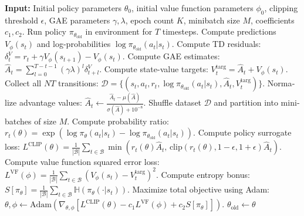\begin{latin}
\begin{algorithm}[H]
\caption{Proximal Policy Optimization (PPO), Actor-Critic Style}
\label{alg:ppo_actor_critic}
\begin{algorithmic}[1]
\State \textbf{Input:} Initial policy parameters $\theta_0$, initial value function parameters $\phi_0$, clipping threshold $\epsilon$, GAE parameters $\gamma, \lambda$, epoch count $K$, minibatch size $M$, coefficients $c_1, c_2$.
        \State Run policy $\pi_{\theta_{\text{old}}}$ in environment for $T$ timesteps.
        \State Compute predictions $V_\phi(s_t)$ and log-probabilities $\log \pi_{\theta_{\text{old}}}(a_t | s_t)$.
        \State Compute TD residuals: $\delta_t^V = r_t + \gamma V_\phi(s_{t+1}) - V_\phi(s_t)$.
        \State Compute GAE estimates: $\hat{A}_t = \sum_{l=0}^{T-t-1} (\gamma \lambda)^l \delta_{t+l}^V$.
        \State Compute state-value targets: $V_t^{\text{targ}} = \hat{A}_t + V_\phi(s_t)$.
    \EndFor
    \State Collect all $NT$ transitions: $\mathcal{D} = \{(s_t, a_t, r_t, \log\pi_{\theta_{\text{old}}}(a_t|s_t), \hat{A}_t, V_t^{\text{targ}})\}$.
    \State Normalize advantage values: $\hat{A}_t \leftarrow \frac{\hat{A}_t - \mu(\hat{A})}{\sigma(\hat{A}) + 10^{-8}}$.
        \State Shuffle dataset $\mathcal{D}$ and partition into minibatches of size $M$.
            \State Compute probability ratio: $r_t(\theta) = \exp\left(\log \pi_\theta(a_t|s_t) - \log \pi_{\theta_{\text{old}}}(a_t|s_t)\right)$.
            \State Compute policy surrogate loss: 
            \State \quad $L^{\text{CLIP}}(\theta) = \frac{1}{|\mathcal{B}|} \sum_{t \in \mathcal{B}} \min\left( r_t(\theta)\hat{A}_t, \, \text{clip}(r_t(\theta), 1-\epsilon, 1+\epsilon)\hat{A}_t \right)$.
            \State Compute value function squared error loss:
            \State \quad $L^{\text{VF}}(\phi) = \frac{1}{|\mathcal{B}|} \sum_{t \in \mathcal{B}} \left( V_\phi(s_t) - V_t^{\text{targ}} \right)^2$.
            \State Compute entropy bonus: $S[\pi_\theta] = \frac{1}{|\mathcal{B}|} \sum_{t \in \mathcal{B}} \mathbb{H}(\pi_\theta(\cdot | s_t))$.
            \State Maximize total objective using Adam:
            \State \quad $\theta, \phi \leftarrow \text{Adam}\left( \nabla_{\theta, \phi} \left[ L^{\text{CLIP}}(\theta) - c_1 L^{\text{VF}}(\phi) + c_2 S[\pi_\theta] \right] \right)$.
        \EndFor
    \EndFor
    \State $\theta_{\text{old}} \leftarrow \theta$
\EndFor
\end{algorithmic}
\end{algorithm}
\end{latin}

